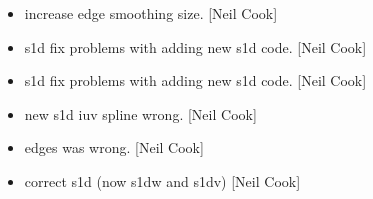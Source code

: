 \documentclass[a4paper,10pt,english]{report}
\begin{document}
\begin{itemize}
\item {} 
 \sphinxhyphen{} increase edge smoothing size. {[}Neil Cook{]}

\item {} 
 \sphinxhyphen{} s1d fix problems with adding new s1d code.
{[}Neil Cook{]}

\item {} 
 \sphinxhyphen{} s1d fix problems with adding new s1d code.
{[}Neil Cook{]}

\item {} 
 \sphinxhyphen{} new s1d \sphinxhyphen{} iuv spline wrong. {[}Neil Cook{]}

\item {} 
 \sphinxhyphen{} edges was wrong. {[}Neil Cook{]}

\item {} 
 \sphinxhyphen{} correct s1d (now s1dw and s1dv) {[}Neil
Cook{]}

\end{itemize}
\end{document}
